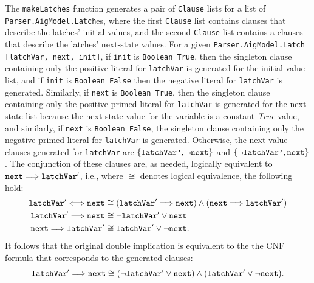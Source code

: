 \documentclass[12pt,a4paper,twoside,openright]{report}
\begin{document}
The \verb,makeLatches, function generates a pair of \verb,Clause, lists
for a list of \verb,Parser.AigModel.Latch,es, where the first \verb,Clause, list contains
clauses that describe the latches' initial values, and the second \verb,Clause, list
contains a clauses that describe the latches' next-state values. For a given
\verb,Parser.AigModel.Latch, \verb.[latchVar, next, init]., if \verb,init, is \verb,Boolean True,,
then the singleton clause containing only the positive literal for \verb,latchVar, is generated for
the initial value list, and if \verb,init, is \verb,Boolean False, then the negative literal for \verb,latchVar,
is generated.
Similarly, if \verb,next, is \verb,Boolean True,, then the singleton clause containing only the positive primed
literal for \verb,latchVar, is generated for the next-state list because the next-state value for the variable
is a constant-{\it True} value, and similarly, if \verb,next, is \verb,Boolean False,,
the singleton clause containing only the negative primed literal for \verb,latchVar, is generated.
Otherwise, the next-value clauses generated for \verb,latchVar, are $\{\verb,latchVar',, \neg \verb,next,\}$
and $\{\neg\verb,latchVar',, \verb,next,\}$. The conjunction of these clauses are, as needed, logically equivalent
to ${\tt next} \Longrightarrow {\tt latchVar}'$, i.e., where $\cong$ denotes logical equivalence,
the following hold:
\begin{align*}
{\tt latchVar}' \Longleftrightarrow {\tt next} &\cong ({\tt latchVar}' \Longrightarrow {\tt next}) \wedge
({\tt next} \Longrightarrow {\tt latchVar}')\\
{\tt latchVar}' \Longrightarrow {\tt next} &\cong \neg {\tt latchVar}' \vee {\tt next}\\
{\tt next} \Longrightarrow {\tt latchVar}' &\cong {\tt latchVar}' \vee \neg {\tt next}.
\end{align*}
It follows that the original double implication is equivalent to the 
the CNF formula that corresponds to the generated clauses:
$${\tt latchVar}' \Longrightarrow {\tt next} \cong
(\neg {\tt latchVar}' \vee {\tt next}) \wedge ({\tt latchVar}' \vee \neg {\tt next}).$$
\end{document}
